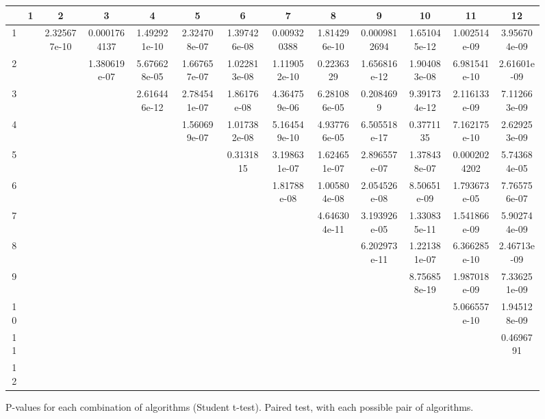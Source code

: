 \begin{landscape}
\begin{figure}
\begin{adjustwidth}{-1cm}{-1cm}
\begin{center}
	\begin{tabular}{|c|c|c|c|c|c|c|c|c|c|c|c|c|} \hline
		& 1 & 2 & 3 & 4 & 5 & 6 & 7 & 8 & 9 & 10 & 11 & 12 \\ \hline \hline
		1 & & 2.325677e-10 & 0.0001764137 & 1.492921e-10 & 2.324708e-07 & 1.397426e-08 & 0.009320388 & 1.814296e-10 & 0.0009812694 & 1.651045e-12 & 1.002514e-09 & 3.956704e-09 \\ \hline
		2 & &  & 1.380619e-07 & 5.676628e-05 & 1.667657e-07 & 1.022813e-08 & 1.119052e-10 & 0.2236329 & 1.656816e-12 & 1.904083e-08 & 6.981541e-10 & 2.61601e-09 \\ \hline
		3 & & &  & 2.616446e-12 & 2.784541e-07 & 1.86176e-08 & 4.364759e-06 & 6.281086e-05 & 0.2084699 & 9.391734e-12 & 2.116133e-09 & 7.112663e-09 \\ \hline
		4 & & & &  & 1.560699e-07 & 1.017382e-08 & 5.164549e-10 & 4.937766e-05 & 6.505518e-17 & 0.3771135 & 7.162175e-10 & 2.629253e-09 \\ \hline
		5 & & & & &  & 0.3131815 & 3.198631e-07 & 1.624651e-07 & 2.896557e-07 & 1.378438e-07 & 0.0002024202 & 5.743684e-05 \\ \hline
		6 & & & & & &  & 1.81788e-08 & 1.005804e-08 & 2.054526e-08 & 8.50651e-09 & 1.793673e-05 & 7.765756e-07 \\ \hline
		7 & & & & & & &  & 4.646304e-11 & 3.193926e-05 & 1.330835e-11 & 1.541866e-09 & 5.902744e-09 \\ \hline
		8 & & & & & & & & & 6.202973e-11 & 1.221381e-07 & 6.366285e-10 & 2.46713e-09 \\ \hline
		9 & & & & & & & & & & 8.756858e-19 & 1.987018e-09 & 7.336251e-09 \\ \hline
		10 & & & & & & & & & & & 5.066557e-10 & 1.945128e-09 \\ \hline
		11 & & & & & & & & & & & & 0.4696791 \\ \hline
		12 & & & & & & & & & & & & \\ \hline

	
	\end{tabular}
\end{center}
\end{adjustwidth}
\caption{P-values for each combination of algorithms (Student t-test). Paired test, with each possible pair of algorithms.}
\label{pv st}
\end{figure}


\end{landscape}
